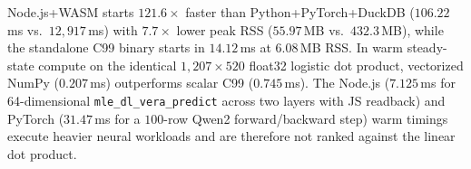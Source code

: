 \documentclass{article}
\begin{document}
\begin{table}[t]
\caption{Median of $7$ interleaved OS process spawns. Process startup and peak RSS are directly comparable across all rows; warm compute compares the shared $1{,}207{\times}520$ logistic kernel only between C99 and NumPy.}
\label{tab:substrates}
\vskip 0.08in
\begin{center}
\end{center}
\vskip -0.14in
\end{table}

Node.js+WASM starts $121.6\times$ faster than Python+PyTorch+DuckDB ($106.22$\,ms vs.\ $12{,}917$\,ms) with $7.7\times$ lower peak RSS ($55.97$\,MB vs.\ $432.3$\,MB), while the standalone C99 binary starts in $14.12$\,ms at $6.08$\,MB RSS. In warm steady-state compute on the identical $1{,}207{\times}520$ float32 logistic dot product, vectorized NumPy ($0.207$\,ms) outperforms scalar C99 ($0.745$\,ms). The Node.js ($7.125$\,ms for 64-dimensional \texttt{mle\_dl\_vera\_predict} across two layers with JS readback) and PyTorch ($31.47$\,ms for a $100$-row Qwen2 forward/backward step) warm timings execute heavier neural workloads and are therefore not ranked against the linear dot product.
\end{document}
